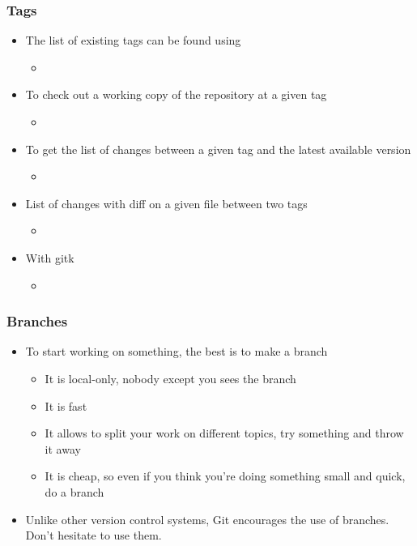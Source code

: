 \begin{frame}
  \frametitle{Tags}
  \begin{itemize}
  \item The list of existing tags can be found using
    \begin{itemize}
    \item {}
    \end{itemize}
  \item To check out a working copy of the repository at a given tag
    \begin{itemize}
    \item {}
    \end{itemize}
  \item To get the list of changes between a given tag and the latest
    available version
    \begin{itemize}
    \item {}
    \end{itemize}
  \item List of changes with diff on a given file between two tags
    \begin{itemize}
    \item {}
    \end{itemize}
  \item With gitk
    \begin{itemize}
    \item {}
    \end{itemize}
  \end{itemize}
\end{frame}

\begin{frame}
  \frametitle{Branches}
  \begin{itemize}
  \item To start working on something, the best is to make a branch
    \begin{itemize}
    \item It is local-only, nobody except you sees the branch
    \item It is fast
    \item It allows to split your work on different topics, try
      something and throw it away
    \item It is cheap, so even if you think you're doing something
      small and quick, do a branch
    \end{itemize}
  \item Unlike other version control systems, Git encourages the use
    of branches. Don't hesitate to use them.
  \end{itemize}
\end{frame}

